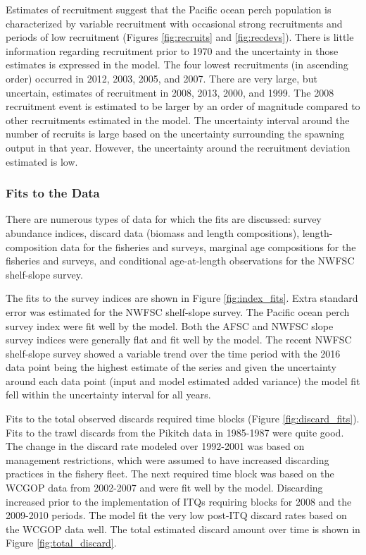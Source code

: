 \documentclass[12pt,]{article}
\begin{document}
Estimates of recruitment suggest that the Pacific ocean perch population
is characterized by variable recruitment with occasional strong
recruitments and periods of low recruitment (Figures \ref{fig:recruits}
and \ref{fig:recdevs}). There is little information regarding
recruitment prior to 1970 and the uncertainty in those estimates is
expressed in the model. The four lowest recruitments (in ascending
order) occurred in 2012, 2003, 2005, and 2007. There are very large, but
uncertain, estimates of recruitment in 2008, 2013, 2000, and 1999. The
2008 recruitment event is estimated to be larger by an order of
magnitude compared to other recruitments estimated in the model. The
uncertainty interval around the number of recruits is large based on the
uncertainty surrounding the spawning output in that year. However, the
uncertainty around the recruitment deviation estimated is low.

\subsubsection{Fits to the Data}\label{fits-to-the-data}

There are numerous types of data for which the fits are discussed:
survey abundance indices, discard data (biomass and length
compositions), length-composition data for the fisheries and surveys,
marginal age compositions for the fisheries and surveys, and conditional
age-at-length observations for the NWFSC shelf-slope survey.

The fits to the survey indices are shown in Figure \ref{fig:index_fits}.
Extra standard error was estimated for the NWFSC shelf-slope survey. The
Pacific ocean perch survey index were fit well by the model. Both the
AFSC and NWFSC slope survey indices were generally flat and fit well by
the model. The recent NWFSC shelf-slope survey showed a variable trend
over the time period with the 2016 data point being the highest estimate
of the series and given the uncertainty around each data point (input
and model estimated added variance) the model fit fell within the
uncertainty interval for all years.

Fits to the total observed discards required time blocks (Figure
\ref{fig:discard_fits}). Fits to the trawl discards from the Pikitch
data in 1985-1987 were quite good. The change in the discard rate
modeled over 1992-2001 was based on management restrictions, which were
assumed to have increased discarding practices in the fishery fleet. The
next required time block was based on the WCGOP data from 2002-2007 and
were fit well by the model. Discarding increased prior to the
implementation of ITQs requiring blocks for 2008 and the 2009-2010
periods. The model fit the very low post-ITQ discard rates based on the
WCGOP data well. The total estimated discard amount over time is shown
in Figure \ref{fig:total_discard}.
\end{document}
